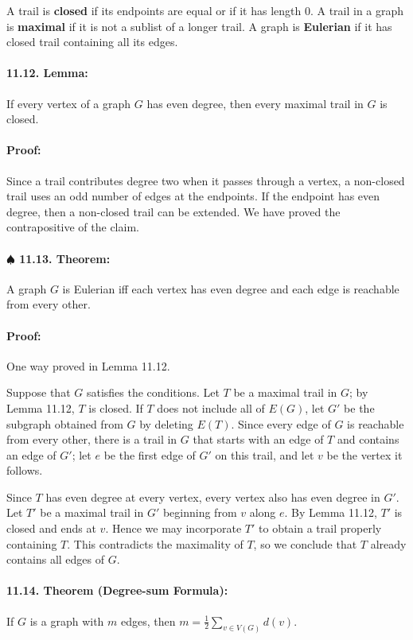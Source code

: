 \documentclass[a4paper, 11pt, twoside]{article}
\begin{document}
A trail is \textbf{closed} if its endpoints are equal or if it has length 0. A trail in a graph is \textbf{maximal} if it is not a sublist of a longer trail. A graph is \textbf{Eulerian} if it has closed trail containing all its edges.

\paragraph{11.12. Lemma:} If every vertex of a graph $G$ has even degree, then every maximal trail in $G$ is closed.

\paragraph{Proof:} Since a trail  contributes degree two when it passes through a vertex, a non-closed trail uses an odd number of edges at the endpoints. If the endpoint has even degree, then a non-closed trail can be extended. We have proved the contrapositive of the claim.

\paragraph{$\spadesuit$ 11.13. Theorem:} A graph $G$ is Eulerian iff each vertex has even degree and each edge is reachable from every other.

\paragraph{Proof:} One way proved in Lemma 11.12.

Suppose that $G$ satisfies the conditions. Let $T$ be a maximal trail in $G$; by Lemma 11.12, $T$ is closed. If $T$ does not include all of $E(G)$, let $G'$ be the subgraph obtained from $G$ by deleting $E(T)$. Since every edge of $G$ is reachable from every other, there is a trail in $G$ that starts with an edge of $T$ and contains an edge of $G'$; let $e$ be the first edge of $G'$ on this trail, and let $v$ be the vertex it follows.

Since $T$ has even degree at every vertex, every vertex also has even degree in $G'$. Let $T'$ be a maximal trail in $G'$ beginning from $v$ along $e$. By Lemma 11.12, $T'$ is closed and ends at $v$. Hence we may incorporate $T'$ to obtain a trail properly containing $T$. This contradicts the maximality of $T$, so we conclude that $T$ already contains all edges of $G$.

\paragraph{11.14. Theorem (Degree-sum Formula):} If $G$ is a graph with $m$ edges, then $m=\frac{1}{2}\sum_{v\in V(G)}d(v)$.
\end{document}
